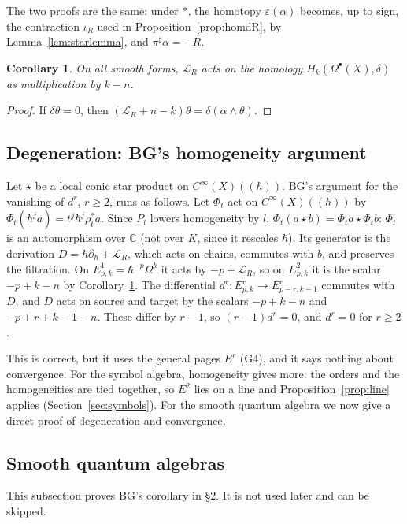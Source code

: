 \documentclass[11pt,oneside,reqno]{article}
\newcommand{\C}{\mathbb C}
\newcommand{\CI}{C^\infty}
\newcommand{\Om}{\Omega}
\newcommand{\eps}{\varepsilon}
\newcommand{\Lie}{\mathcal L}
\newcommand{\hb}{\hbar}
\newcommand{\Lser}[1]{(\!(#1)\!)}
\newcommand{\pa}{\partial}
\theoremstyle{plain}
\newtheorem{corollary}[theorem]{Corollary}
\theoremstyle{definition}
\theoremstyle{remark}
\begin{document}
The two proofs are the same: under \(*\), the homotopy \(\eps(\alpha)\) becomes, up to
sign, the contraction \(\iota_R\) used in Proposition~\ref{prop:homdR}, by
Lemma~\ref{lem:starlemma}, and \(\pi^\sharp\alpha=-R\).

\begin{corollary}\label{cor:LRonH}
On all smooth forms, \(\Lie_R\) acts on the homology \(H_k(\Om^\bullet(X),\delta)\) as
multiplication by \(k-n\).
\end{corollary}

\begin{proof}
If \(\delta\theta=0\), then \((\Lie_R+n-k)\theta=\delta(\alpha\wedge\theta)\).
\end{proof}

\subsection{Degeneration: BG's homogeneity argument}\label{subsec:degen}
Let \(\star\) be a local conic star product on \(\CI(X)\Lser{\hb}\). BG's argument for
the vanishing of \(d^r\), \(r\ge2\), runs as follows. Let \(\Phi_t\) act on
\(\CI(X)\Lser{\hb}\) by \(\Phi_t(\hb^ja)=t^j\hb^j\rho_t^*a\). Since \(P_l\) lowers homogeneity
by \(l\), \(\Phi_t(a\star b)=\Phi_ta\star\Phi_tb\): \(\Phi_t\) is an automorphism over \(\C\)
(not over \(K\), since it rescales \(\hb\)). Its generator is the derivation
\(D=\hb\pa_\hb+\Lie_R\), which acts on chains, commutes with \(b\), and preserves the
filtration. On \(E^1_{p,k}=\hb^{-p}\Om^k\) it acts by \(-p+\Lie_R\), so on \(E^2_{p,k}\) it is the
scalar \(-p+k-n\) by Corollary~\ref{cor:LRonH}. The differential
\(d^r:E^r_{p,k}\to E^r_{p-r,k-1}\) commutes with \(D\), and \(D\) acts on source and
target by the scalars \(-p+k-n\) and \(-p+r+k-1-n\). These differ by \(r-1\), so
\((r-1)d^r=0\), and \(d^r=0\) for \(r\ge2\).

This is correct, but it uses the general pages \(E^r\) (G4), and it says nothing
about convergence. For the symbol algebra, homogeneity gives more: the
orders and the homogeneities are tied together, so \(E^2\) lies on a line and
Proposition~\ref{prop:line} applies (Section~\ref{sec:symbols}). For the
smooth quantum algebra we now give a direct proof of degeneration and
convergence.

\subsection{Smooth quantum algebras}\label{subsec:smoothquantum}
This subsection proves BG's corollary in \S2. It is not used later and can be
skipped.
\end{document}
